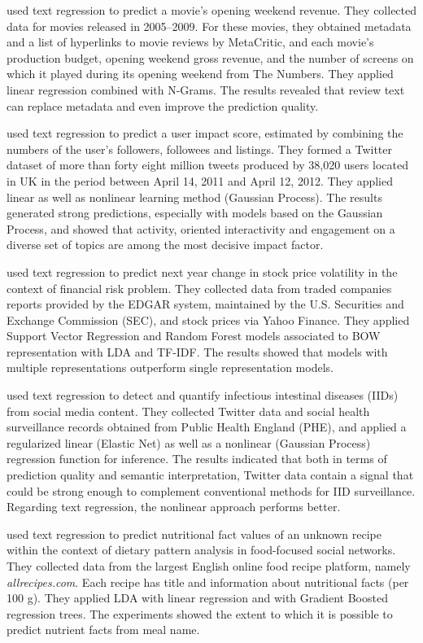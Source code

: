 \textcite{joshi2010} used text regression to predict a movie's opening weekend revenue. They collected data for movies released in 2005–2009. For these movies, they obtained metadata and a list of hyperlinks to movie reviews by MetaCritic, and each movie's production budget, opening weekend gross revenue, and the number of screens on which it played during its opening weekend from The Numbers. They applied linear regression combined with N-Grams. The results revealed that review text can replace metadata and even improve the prediction quality. 

\textcite{lampos2014} used text regression to predict a user impact score, estimated by combining the numbers of the user's followers, followees and listings. They formed a Twitter dataset of more than forty eight million tweets produced by 38,020 users located in UK in the period between April 14, 2011 and April 12, 2012. They applied linear as well as nonlinear learning method (Gaussian Process). The results generated strong predictions, especially with models based on the Gaussian Process, and showed that activity, oriented interactivity and engagement on a diverse set of topics are among the most decisive impact factor. 

\textcite{Trusov2016} used text regression to predict next year change in stock price volatility in the context of financial risk problem. They collected data from traded companies reports provided by the EDGAR system, maintained by the U.S. Securities and Exchange Commission (SEC), and stock prices via Yahoo Finance. They applied Support Vector Regression and Random Forest models associated to \gls{BOW} representation with \gls{LDA} and \gls{TF-IDF}. The results showed that models with multiple representations outperform single representation models.

\textcite{Zou2016} used text regression to detect and quantify infectious intestinal diseases (IIDs) from social media content. They collected Twitter data and social health surveillance records obtained from Public Health England (PHE), and applied a regularized linear (Elastic Net) as well as a nonlinear (Gaussian Process) regression function for inference. The results indicated that both in terms of prediction quality and semantic interpretation, Twitter data contain a signal that could be strong enough to complement conventional methods for IID surveillance. Regarding text regression, the nonlinear approach performs better.

\textcite{Kusmierczyk2016} used text regression to predict nutritional fact values of an unknown recipe within the context of dietary pattern analysis in food-focused social networks. They collected data from the largest English online food recipe platform, namely \textit{allrecipes.com}. Each recipe has title and information about nutritional facts (per 100 g). They applied \gls{LDA} with linear regression and with Gradient Boosted regression trees. The experiments showed the extent to which it is possible to predict nutrient facts from meal name. 


